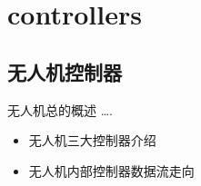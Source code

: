 \chapter{controllers}
\section{无人机控制器}
无人机总的概述 \dots.
\begin{itemize}
    \item 无人机三大控制器介绍
    \item 无人机内部控制器数据流走向
\end{itemize}